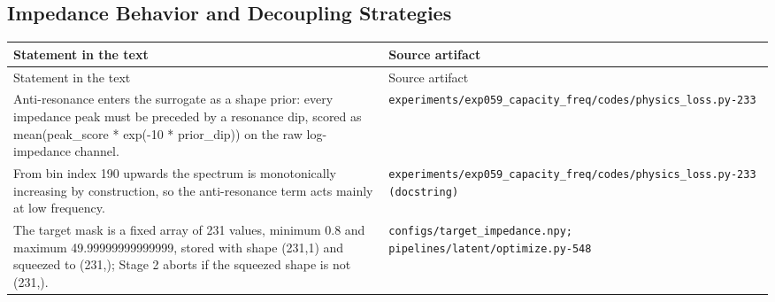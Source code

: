 \subsection*{Impedance Behavior and Decoupling Strategies}
\begingroup\small
\begin{longtable}{p{} p{}}
\hline
Statement in the text & Source artifact \\
\hline
\endfirsthead
\hline
Statement in the text & Source artifact \\
\hline
\endhead
Anti-resonance enters the surrogate as a shape prior: every impedance peak must be preceded by a resonance dip, scored as mean(peak\_score * exp(-10 * prior\_dip)) on the raw log-impedance channel. & \texttt{experiments/\allowbreak{}exp059\_\allowbreak{}capacity\_\allowbreak{}freq/\allowbreak{}codes/\allowbreak{}physics\_\allowbreak{}loss.py-233} \\
From bin index 190 upwards the spectrum is monotonically increasing by construction, so the anti-resonance term acts mainly at low frequency. & \texttt{experiments/\allowbreak{}exp059\_\allowbreak{}capacity\_\allowbreak{}freq/\allowbreak{}codes/\allowbreak{}physics\_\allowbreak{}loss.py-233 (docstring)} \\
The target mask is a fixed array of 231 values, minimum 0.8 and maximum 49.99999999999999, stored with shape (231,1) and squeezed to (231,); Stage 2 aborts if the squeezed shape is not (231,). & \texttt{configs/\allowbreak{}target\_\allowbreak{}impedance.npy; pipelines/\allowbreak{}latent/\allowbreak{}optimize.py-548} \\
\hline
\end{longtable}
\endgroup

